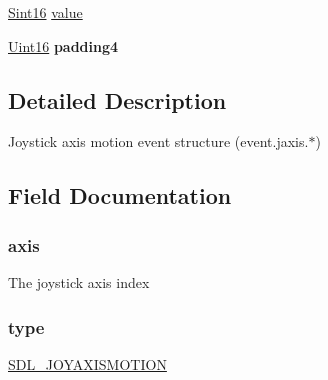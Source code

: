 \begin{DoxyCompactItemize}
\item 
\hyperlink{_s_d_l__stdinc_8h_a9d0257032c0e146ab6121bf0122712f5}{Sint16} \hyperlink{struct_s_d_l___joy_axis_event_ae36d960bffe70dcf148258f6dbcb0ef8}{value}
\item 
\hyperlink{_s_d_l__stdinc_8h_a31fcc0a076c9068668173ee26d33e42b}{Uint16} {\bfseries padding4}\hypertarget{struct_s_d_l___joy_axis_event_a15b93152b4cd6e47ce3a9ab23f452c8a}{}\label{struct_s_d_l___joy_axis_event_a15b93152b4cd6e47ce3a9ab23f452c8a}

\end{DoxyCompactItemize}


\subsection{Detailed Description}
Joystick axis motion event structure (event.\+jaxis.$\ast$) 

\subsection{Field Documentation}
\subsubsection[{\texorpdfstring{axis}{axis}}]{ axis}\hypertarget{struct_s_d_l___joy_axis_event_a911494630318160a9e7ad91e3fe7e6a0}{}\label{struct_s_d_l___joy_axis_event_a911494630318160a9e7ad91e3fe7e6a0}
The joystick axis index 
\subsubsection[{\texorpdfstring{type}{type}}]{ type}\hypertarget{struct_s_d_l___joy_axis_event_aa40a9b05c3154032b9f2d7220e9f08dc}{}\label{struct_s_d_l___joy_axis_event_aa40a9b05c3154032b9f2d7220e9f08dc}
\hyperlink{_s_d_l__events_8h_a3b589e89be6b35c02e0dd34a55f3fccaaf0803b3f8a12de3d85f81ebd7b514cd1}{S\+D\+L\+\_\+\+J\+O\+Y\+A\+X\+I\+S\+M\+O\+T\+I\+ON} 
